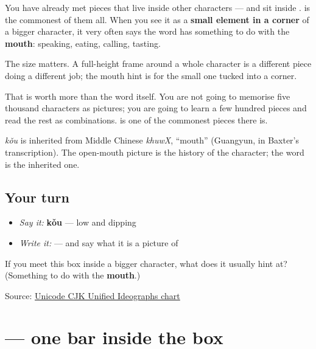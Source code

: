 \begin{culture}
You have already met pieces that live inside other characters —  and  sit inside .  is the commonest of them all. When you see it as a \textbf{small element in a corner} of a bigger character, it very often says the word has something to do with the \textbf{mouth}: speaking, eating, calling, tasting.

The size matters. A full-height frame around a whole character is a different piece doing a different job; the mouth hint is for the small one tucked into a corner.

That is worth more than the word itself. You are not going to memorise five thousand characters as pictures; you are going to learn a few hundred pieces and read the rest as combinations.  is one of the commonest pieces there is.
\end{culture}

\begin{cousinweb}
\textbf{} \emph{kǒu} is inherited from Middle Chinese \emph{khuwX}, \textquotedblleft{}mouth\textquotedblright{} (Guangyun, in Baxter's transcription). The open-mouth picture is the history of the character; the word is the inherited one.
\end{cousinweb}

\subsection*{Your turn}
\begin{itemize}
\raggedright
  \item \emph{Say it:} \textbf{kǒu} — low and dipping
  \item \emph{Write it:}  — and say what it is a picture of
\end{itemize}

\begin{tcolorbox}[breakable,colback=teal!4,colframe=teal!35!black,title={Before you move on}]
If you meet this box inside a bigger character, what does it usually hint at? (Something to do with the \textbf{mouth}.)

Source: \href{https://www.unicode.org/charts/PDF/U4E00.pdf}{Unicode CJK Unified Ideographs chart}
\end{tcolorbox}
\section[\texorpdfstring{\zh{日} (rì)}{日 (rì)}]{ — one bar inside the box}

